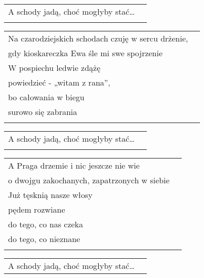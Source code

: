 \documentclass[a5paper]{article}
\begin{document}
\noindent
\begin{tabular}{@{}p{8.5cm}p{3cm}@{}}
A schody jadą, choć mogłyby stać… \\ \\
\end{tabular}
 
\noindent
\begin{tabular}{@{}p{8.5cm}p{3cm}@{}}
Na czarodziejskich schodach czuję w sercu drżenie, \\
gdy  kioskareczka Ewa śle mi swe spojrzenie\\
W pospiechu ledwie zdążę\\
powiedzieć  - „witam z rana”,\\
bo całowania w biegu\\
surowo się zabrania\\\\
\end{tabular}
 
\noindent
\begin{tabular}{@{}p{8.5cm}p{3cm}@{}}
A schody jadą, choć mogłyby stać…\\\\
\end{tabular}
 
\noindent
\begin{tabular}{@{}p{8.5cm}p{3cm}@{}}
A Praga drzemie i nic jeszcze nie wie\\
o dwojgu zakochanych, zapatrzonych w siebie\\
Już tęsknią nasze włosy\\
pędem rozwiane\\
do tego, co nas czeka\\
do tego, co nieznane\\\\
\end{tabular}
 
\noindent
\begin{tabular}{@{}p{8.5cm}p{3cm}@{}}
A schody jadą, choć mogłyby stać…
\end{tabular}
\end{document}
